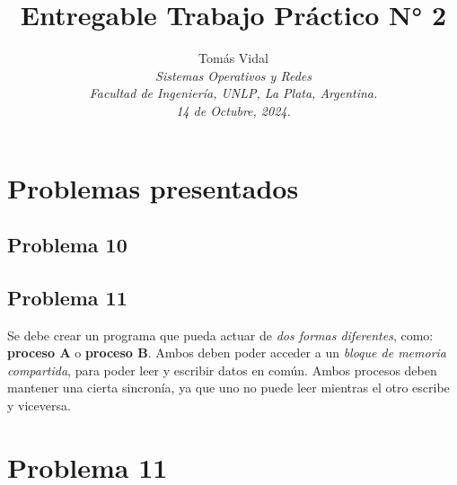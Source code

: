 \documentclass[letterpaper, 10 pt, conference]{ieeeconf}  %
\title{\LARGE \bf Entregable Trabajo Práctico N° 2}
\author{
  Tom\'as Vidal\\
  {\it Sistemas Operativos y Redes}\\
  {\it Facultad de Ingenier\'ia, UNLP, La Plata, Argentina.}\\
  {\it 14 de Octubre, 2024.}
}                                            %
\begin{document}
\maketitle
\thispagestyle{empty}
\pagestyle{empty}

\section{Problemas presentados}
\subsection{Problema 10}


\subsection{Problema 11}
Se debe crear un programa que pueda actuar de \textit{dos formas diferentes}, como: \textbf{proceso A} o \textbf{proceso B}. Ambos deben poder acceder a un \textit{bloque de memoria compartida}, para poder leer y escribir datos en común. Ambos procesos deben mantener una cierta sincronía, ya que uno no puede leer mientras el otro escribe y viceversa.

\section{Problema 11}
\end{document}
